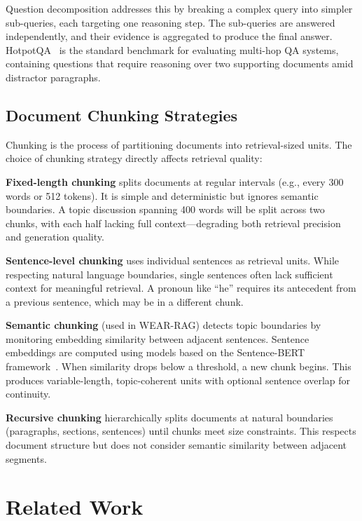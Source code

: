 \documentclass[conference]{IEEEtran}
\begin{document}
Question decomposition addresses this by breaking a complex query into simpler sub-queries, each targeting one reasoning step. The sub-queries are answered independently, and their evidence is aggregated to produce the final answer. HotpotQA~\cite{yang2018hotpotqa} is the standard benchmark for evaluating multi-hop QA systems, containing questions that require reasoning over two supporting documents amid distractor paragraphs.

\subsection{Document Chunking Strategies}

Chunking is the process of partitioning documents into retrieval-sized units. The choice of chunking strategy directly affects retrieval quality:

\textbf{Fixed-length chunking} splits documents at regular intervals (e.g., every 300 words or 512 tokens). It is simple and deterministic but ignores semantic boundaries. A topic discussion spanning 400 words will be split across two chunks, with each half lacking full context---degrading both retrieval precision and generation quality.

\textbf{Sentence-level chunking} uses individual sentences as retrieval units. While respecting natural language boundaries, single sentences often lack sufficient context for meaningful retrieval. A pronoun like ``he'' requires its antecedent from a previous sentence, which may be in a different chunk.

\textbf{Semantic chunking} (used in WEAR-RAG) detects topic boundaries by monitoring embedding similarity between adjacent sentences. Sentence embeddings are computed using models based on the Sentence-BERT framework~\cite{reimers2019sentence}. When similarity drops below a threshold, a new chunk begins. This produces variable-length, topic-coherent units with optional sentence overlap for continuity.

\textbf{Recursive chunking} hierarchically splits documents at natural boundaries (paragraphs, sections, sentences) until chunks meet size constraints. This respects document structure but does not consider semantic similarity between adjacent segments.

\section{Related Work}
\end{document}

